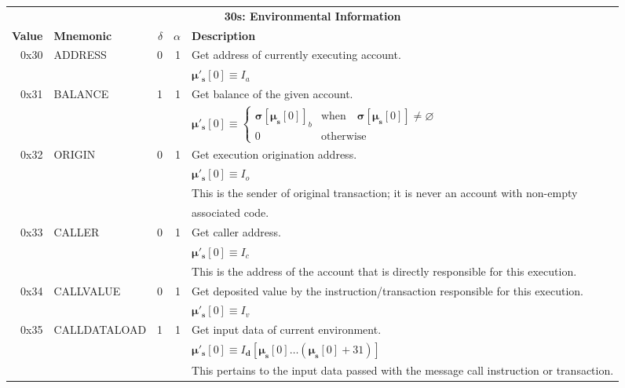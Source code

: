 \documentclass[9pt,oneside]{amsart}
\begin{document}
\begin{tabular*}{\columnwidth}[h]{rlrrl}
\toprule
\multicolumn{5}{c}{\textbf{30s: Environmental Information}} \vspace{5pt} \\
\textbf{Value} & \textbf{Mnemonic} & $\delta$ & $\alpha$ & \textbf{Description} \vspace{5pt} \\
0x30 & {\small ADDRESS} & 0 & 1 & Get address of currently executing account. \\
&&&& $\boldsymbol{\mu}'_\mathbf{s}[0] \equiv I_a$ \\
\midrule
0x31 & {\small BALANCE} & 1 & 1 & Get balance of the given account. \\
&&&& $\boldsymbol{\mu}'_\mathbf{s}[0] \equiv \begin{cases}\boldsymbol{\sigma}[\boldsymbol{\mu}_\mathbf{s}[0]]_b& \text{when} \quad \boldsymbol{\sigma}[\boldsymbol{\mu}_\mathbf{s}[0]] \neq \varnothing\\0&\text{otherwise}\end{cases}$ \\
\midrule
0x32 & {\small ORIGIN} & 0 & 1 & Get execution origination address. \\
&&&& $\boldsymbol{\mu}'_\mathbf{s}[0] \equiv I_o$ \\
&&&& This is the sender of original transaction; it is never an account with non-empty \\
&&&& associated code. \\
\midrule
0x33 & {\small CALLER} & 0 & 1 & Get caller address. \\
&&&& $\boldsymbol{\mu}'_\mathbf{s}[0] \equiv I_c$ \\
&&&& This is the address of the account that is directly responsible for this execution. \\
\midrule
0x34 & {\small CALLVALUE} & 0 & 1 & Get deposited value by the instruction/transaction responsible for this execution. \\
&&&& $\boldsymbol{\mu}'_\mathbf{s}[0] \equiv I_v$ \\
\midrule
0x35 & {\small CALLDATALOAD} & 1 & 1 & Get input data of current environment. \\
&&&& $\boldsymbol{\mu}'_\mathbf{s}[0] \equiv I_\mathbf{d}[ \boldsymbol{\mu}_\mathbf{s}[0] \dots (\boldsymbol{\mu}_\mathbf{s}[0] + 31) ]$ \\
&&&& This pertains to the input data passed with the message call instruction or transaction. \\

\end{tabular*}
\end{document}
